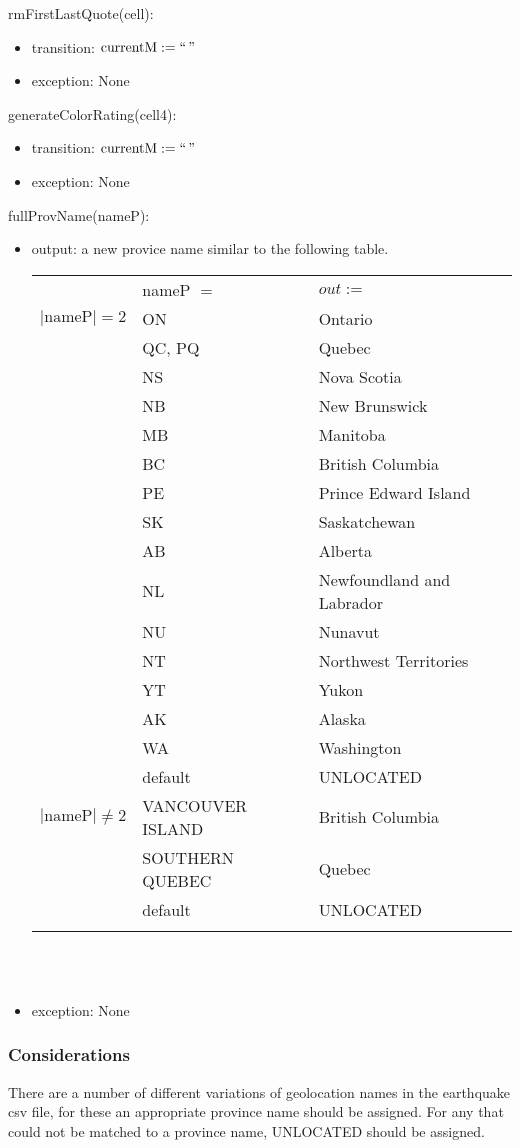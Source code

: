 \documentclass[12pt]{article}
\begin{document}
\noindent rmFirstLastQuote(cell):
\begin{itemize}
\item transition: $\mbox{currentM} := ` ` \,  "$
\item exception: None
\end{itemize}

\noindent generateColorRating(cell4):
\begin{itemize}
\item transition: $\mbox{currentM} := ` ` \,  "$
\item exception: None
\end{itemize}

\noindent fullProvName(nameP):
\begin{itemize}
\item output: a new provice name similar to the following table.

\begin{tabular}{|p{3cm}|p{3.5cm}|l|}
\hhline{~|-|-|}
\multicolumn{1}{l|}{} & nameP $=$ & \multicolumn{1}{l|}{$out :=$}\\
\hhline{|-|-|-|}
$|\mbox{nameP}| = 2$ & ON & Ontario\\
\hhline{|~|-|-|}
 & QC, PQ & Quebec\\
\hhline{|~|-|-|}
 & NS & Nova Scotia\\
\hhline{|~|-|-|}
 & NB & New Brunswick\\
\hhline{|~|-|-|}
 & MB & Manitoba\\
\hhline{|~|-|-|}
 & BC & British Columbia\\
\hhline{|~|-|-|}
 & PE & Prince Edward Island\\
\hhline{|~|-|-|}
 & SK & Saskatchewan\\
\hhline{|~|-|-|}
 & AB & Alberta\\
\hhline{|~|-|-|}
 & NL & Newfoundland and Labrador\\
\hhline{|~|-|-|}
 & NU & Nunavut\\
\hhline{|~|-|-|}
 & NT & Northwest Territories\\
\hhline{|~|-|-|}
 & YT & Yukon\\
\hhline{|~|-|-|}
 & AK & Alaska\\
\hhline{|~|-|-|}
 & WA & Washington\\
\hhline{|~|-|-|}
 & default & UNLOCATED\\
\hhline{|-|-|-|}
$|\mbox{nameP}| \neq 2$ & VANCOUVER ISLAND & British Columbia\\
\hhline{|~|-|-|}
& SOUTHERN QUEBEC & Quebec\\
\hhline{|~|-|-|}
& default & UNLOCATED\\
\hhline{|-|-|-|}
\end{tabular}\\\\

\item exception: None
\end{itemize}

\subsubsection* {Considerations}

There are a number of different variations of geolocation names in the earthquake csv file, for these an appropriate province name
should be assigned. For any that could not be matched to a province name, UNLOCATED should be assigned.\\
\end{document}
